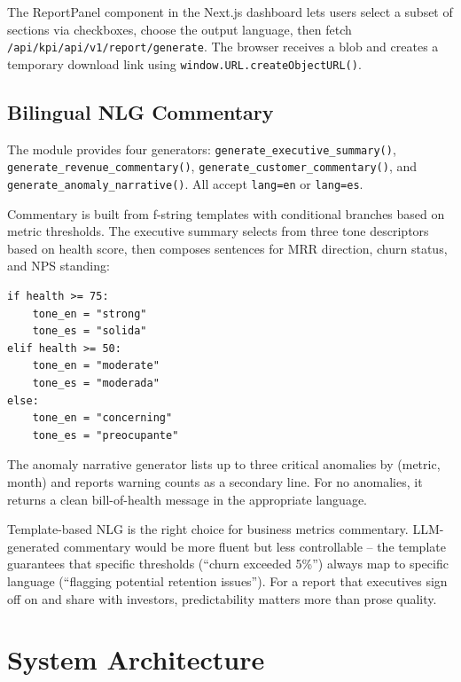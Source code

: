 The ReportPanel component in the Next.js dashboard lets users select a subset of sections via checkboxes, choose the output language, then fetch \texttt{/api/kpi/api/v1/report/generate}. The browser receives a blob and creates a temporary download link using \texttt{window.URL.createObjectURL()}.

\subsection{Bilingual NLG Commentary}

The  module provides four generators: \texttt{generate\_executive\_summary()}, \texttt{generate\_revenue\_commentary()}, \texttt{generate\_customer\_commentary()}, and \texttt{generate\_anomaly\_narrative()}. All accept \texttt{lang=\textquotesingle en\textquotesingle} or \texttt{lang=\textquotesingle es\textquotesingle}.

Commentary is built from f-string templates with conditional branches based on metric thresholds. The executive summary selects from three tone descriptors based on health score, then composes sentences for MRR direction, churn status, and NPS standing:

\begin{lstlisting}[style=python, caption={Bilingual tone selection in commentary.py.}]
if health >= 75:
    tone_en = "strong"
    tone_es = "solida"
elif health >= 50:
    tone_en = "moderate"
    tone_es = "moderada"
else:
    tone_en = "concerning"
    tone_es = "preocupante"
\end{lstlisting}

The anomaly narrative generator lists up to three critical anomalies by (metric, month) and reports warning counts as a secondary line. For no anomalies, it returns a clean bill-of-health message in the appropriate language.

\begin{keyinsight}
Template-based NLG is the right choice for business metrics commentary. LLM-generated commentary would be more fluent but less controllable -- the template guarantees that specific thresholds (``churn exceeded 5\%'') always map to specific language (``flagging potential retention issues''). For a report that executives sign off on and share with investors, predictability matters more than prose quality.
\end{keyinsight}

\section{System Architecture}
\label{sec:kpi-architecture}

